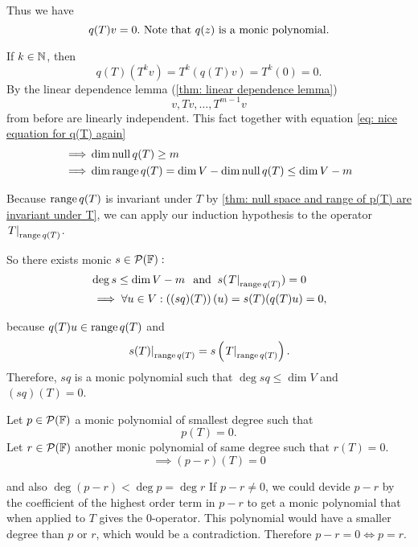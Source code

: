 \begin{prf}
  Thus we have
  \begin{equation}
    q(T) v=0. $ Note that $q(z)$ is a monic polynomial.$
  \end{equation}

  If $k \in \mathbb{N}$, then
  \begin{equation}
    \label{eq: nice equation for q(T) again}
    q(T)(T^kv)=T^k(q(T)v) =T^k (0) =0.
  \end{equation}
  By the linear dependence lemma (\ref{thm: linear dependence lemma}) \begin{equation}
     v, Tv, \dots, T^{m-1}v
  \end{equation}
  from before are linearly independent. This fact together with equation \eqref{eq: nice equation for q(T) again}
  \begin{equation}
    \begin{aligned}
      \implies &\dim \operatorname{null} q(T)   \geq m \\
      \implies &\dim \operatorname{range} q(T)  = \dim V - \dim \operatorname{null} q(T)
      \leq \dim V - m
    \end{aligned}
  \end{equation}

  Because $\operatorname{range} q(T)$ is invariant under $T$ by  \ref{thm: null space and range of p(T) are invariant under T}, we can apply our induction hypothesis to the operator $\left.T\right|_{\operatorname{range} q(T)}$.

  So there exists monic $s \in \mathcal{P} (\mathbb{F}):$
  \begin{equation}
  \begin{aligned}
    &\deg s \leq \dim V - m \;\;\, \text{and}\;\; s(\left.T\right|_{\operatorname{range} q(T)})=0 \\
    &\implies \forall u \in V: \left((sq)(T)\right)(u) = s(T) (q(T)u) = 0,
  \end{aligned}
  \end{equation}

  because $q(T)u \in \operatorname{range} q(T)$ and \begin{equation}
    \left.s(T)\right|_{\operatorname{range} q(T)}=s\left( \left.T\right|_{\operatorname{range} q(T)} \right ).
  \end{equation}
  Therefore, $sq$ is a monic polynomial such that $\deg sq \leq \dim V$ and $(sq)(T)=0$.

   Let $p\in \mathcal{P} (\mathbb{F})$ a monic polynomial of smallest degree such that
  \begin{equation}
    p(T)=0.
  \end{equation} Let $r\in \mathcal{P} ( \mathbb{F})$ another monic polynomial of same degree such that $r(T)=0.$
  \begin{equation}
    \implies (p-r) (T) = 0
  \end{equation}

  and also $\deg (p-r) < \deg p = \deg r$ If $p-r \neq 0$, we could devide $p-r$ by the coefficient of the highest order term in $p-r$ to get a monic polynomial that when applied to $T$ gives the $0$-operator. This polynomial would have a smaller degree than $p$ or $r$, which would be a contradiction. Therefore $p-r=0 \iff p = r$.
\end{prf}


